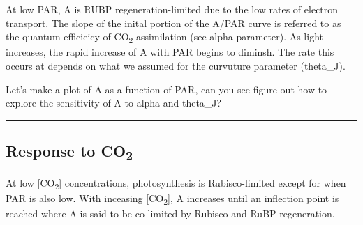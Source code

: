 \documentclass[]{article}
\newenvironment{Shaded}{\begin{snugshade}}{\end{snugshade}}
\newcommand{\CommentTok}[1]{\textcolor[rgb]{0.56,0.35,0.01}{\textit{#1}}}
\newcommand{\DataTypeTok}[1]{\textcolor[rgb]{0.13,0.29,0.53}{#1}}
\newcommand{\DecValTok}[1]{\textcolor[rgb]{0.00,0.00,0.81}{#1}}
\newcommand{\FloatTok}[1]{\textcolor[rgb]{0.00,0.00,0.81}{#1}}
\newcommand{\KeywordTok}[1]{\textcolor[rgb]{0.13,0.29,0.53}{\textbf{#1}}}
\newcommand{\NormalTok}[1]{#1}
\newcommand{\OperatorTok}[1]{\textcolor[rgb]{0.81,0.36,0.00}{\textbf{#1}}}
\newcommand{\OtherTok}[1]{\textcolor[rgb]{0.56,0.35,0.01}{#1}}
\newcommand{\StringTok}[1]{\textcolor[rgb]{0.31,0.60,0.02}{#1}}
\begin{document}
At low PAR, A is RUBP regeneration-limited due to the low rates of
electron transport. The slope of the inital portion of the A/PAR curve
is referred to as the quantum efficieicy of CO\textsubscript{2}
assimilation (see alpha parameter). As light increases, the rapid
increase of A with PAR begins to diminsh. The rate this occurs at
depends on what we assumed for the curvuture parameter (theta\_J).

Let's make a plot of A as a function of PAR, can you see figure out how
to explore the sensitivity of A to alpha and theta\_J?

\begin{Shaded}
\end{Shaded}

\begin{center}\rule{0.5\linewidth}{\linethickness}\end{center}

\hypertarget{response-to-co2}{%
\subsection{\texorpdfstring{Response to
CO\textsubscript{2}}{Response to CO2}}\label{response-to-co2}}

At low {[}CO\textsubscript{2}{]} concentrations, photosynthesis is
Rubisco-limited except for when PAR is also low. With inceasing
{[}CO\textsubscript{2}{]}, A increases until an inflection point is
reached where A is said to be co-limited by Rubisco and RuBP
regeneration.
\end{document}
